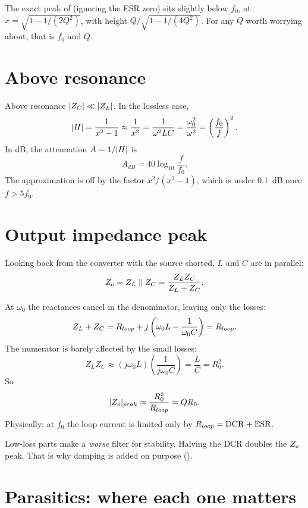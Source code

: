 The exact peak of  (ignoring the ESR zero) sits slightly
below $f_0$, at $x = \sqrt{1 - 1/(2Q^2)}$, with height $Q/\sqrt{1 - 1/(4Q^2)}$.
For any $Q$ worth worrying about, that is $f_0$ and $Q$.

\section{Above resonance}
\label{sec:above-resonance}

\begin{derivation}
	Above resonance $\lvert Z_C\rvert \ll \lvert Z_L\rvert$. In the lossless case,
	\[
		\lvert H\rvert = \frac{1}{x^2 - 1} \approx \frac{1}{x^2}
		= \frac{1}{\omega^2 LC} = \frac{\omega_0^2}{\omega^2}
		= \left(\frac{f_0}{f}\right)^2.
	\]
	In dB, the attenuation $A = 1/\lvert H\rvert$ is
	\[
		A_{dB} = 40\log_{10}\frac{f}{f_0}.
	\]
	The approximation is off by the factor $x^2/(x^2 - 1)$, which is under
	0.1~dB once $f > 5f_0$.
\end{derivation}

\section{Output impedance peak}
\label{sec:zo-peak}

Looking back from the converter with the source shorted, $L$ and $C$ are in parallel:
\[
	Z_o = Z_L \parallel Z_C = \frac{Z_L Z_C}{Z_L + Z_C}.
\]

\begin{derivation}
	At $\omega_0$ the reactances cancel in the denominator, leaving only the losses:
	\[
		Z_L + Z_C = R_{loop} + j\left(\omega_0 L - \frac{1}{\omega_0 C}\right) = R_{loop}.
	\]
	The numerator is barely affected by the small losses:
	\[
		Z_L Z_C \approx (j\omega_0 L)\left(\frac{1}{j\omega_0 C}\right) = \frac{L}{C} = R_0^2.
	\]
	So
	\begin{equation}\label{eq:zo-peak}
		\lvert Z_o\rvert_{peak} \approx \frac{R_0^2}{R_{loop}} = QR_0.
	\end{equation}
	Physically: at $f_0$ the loop current is limited only by $R_{loop} = \mathrm{DCR} + \mathrm{ESR}$.
\end{derivation}

\begin{idea}
	Low-loss parts make a \emph{worse} filter for stability. Halving the DCR
	doubles the $Z_o$ peak. That is why damping is added on purpose ().
\end{idea}

\section{Parasitics: where each one matters}

